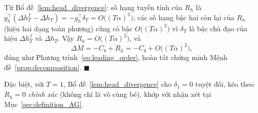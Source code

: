 Từ Bổ đề~\ref{lem:head_divergence}: số hạng tuyến tính của $R_h$ là $g_h^\top(\Delta h_T^f - \Delta h_T) = -g_h^\top\delta_T = O\big((T\alpha)^2\big)$; các số hạng bậc hai còn lại của $R_h$ (hiệu hai dạng toàn phương) cũng có bậc $O\big((T\alpha)^2\big)$ vì $\delta_T$ là bậc chủ đạo của hiệu $\Delta h_T^f$ và $\Delta h_T$. Vậy $R_h = O\big((T\alpha)^2\big)$, và
\[
    \Delta M = -C_b + R_h = -C_b + O\big((T\alpha)^2\big),
\]
đúng như Phương trình~\eqref{eq:leading_order}, hoàn tất chứng minh Mệnh đề~\ref{prop:decomposition}. $\blacksquare$

Đặc biệt, với $T=1$, Bổ đề~\ref{lem:head_divergence} cho $\delta_1=0$ tuyệt đối, kéo theo $R_h=0$ \emph{chính xác} (không chỉ là vô cùng bé), khớp với nhận xét tại Mục~\ref{sec:definition_AG}.
